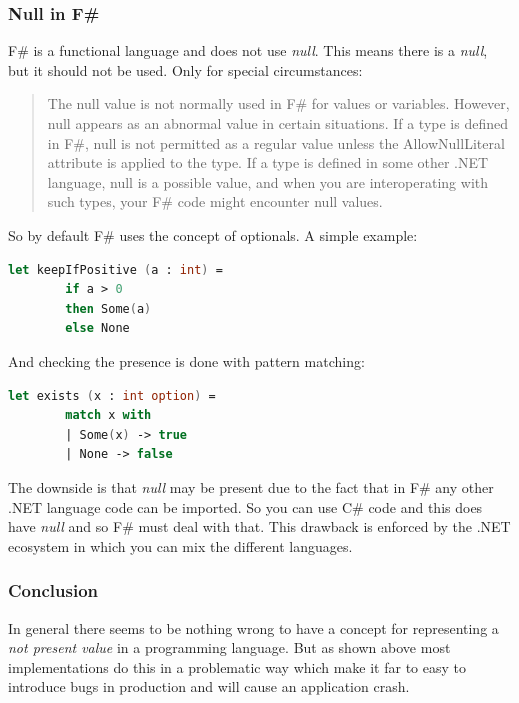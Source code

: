 \documentclass[11pt, a4paper]{report}
\begin{document}
\subsubsection{Null in F\#}

F\# is a functional language and does not use \textit{null}. This means there is a \textit{null}, but it should not be used. Only for special circumstances:

\begin{quotation}
    The null value is not normally used in F\# for values or variables. However, null appears as an abnormal value in certain situations. If a type is defined in F\#, null is not permitted as a regular value unless the AllowNullLiteral attribute is applied to the type. If a type is defined in some other .NET language, null is a possible value, and when you are interoperating with such types, your F\# code might encounter null values.\cite{null-in-fsharp}
\end{quotation}
 So by default F\# uses the concept of optionals\cite{optional-in-fsharp}. A simple example:

\begin{lstlisting}[language=FSharp]
    let keepIfPositive (a : int) = 
        if a > 0 
        then Some(a) 
        else None
\end{lstlisting}

And checking the presence is done with pattern matching:

\begin{lstlisting}[language=FSharp]
    let exists (x : int option) =
        match x with
        | Some(x) -> true
        | None -> false
\end{lstlisting}

The downside is that \textit{null} may be present due to the fact that in F\# any other .NET language code can be imported. So you can use C\# code and this does have \textit{null} and so F\# must deal with that. This drawback is enforced by the .NET ecosystem in which you can mix the different languages.

\subsubsection{Conclusion}

In general there seems to be nothing wrong to have a concept for representing a \textit{not present value} in a programming language. But as shown above most implementations do this in a problematic way which make it far to easy to introduce bugs in production and will cause an application crash.
\end{document}

